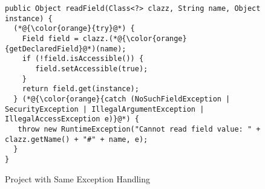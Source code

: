 \begin{figure}[t] %
	\centering
\begin{lstlisting}[]
public Object readField(Class<?> clazz, String name, Object instance) {
  (*@{\color{orange}{try}@*) {
    Field field = clazz.(*@{\color{orange}{getDeclaredField}@*)(name);
    if (!field.isAccessible()) {
       field.setAccessible(true);
    }
    return field.get(instance);
  } (*@{\color{orange}{catch (NoSuchFieldException | SecurityException | IllegalArgumentException | IllegalAccessException e)}@*) {
   throw new RuntimeException("Cannot read field value: " + clazz.getName() + "#" + name, e);
  }
}
\end{lstlisting}
        \vspace{-16pt}
        \caption{Project  with Same Exception Handling}
        \label{fig:example3}
\end{figure}
